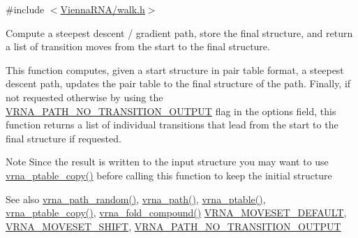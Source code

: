 {\ttfamily \#include $<$\hyperlink{walk_8h}{Vienna\+R\+N\+A/walk.\+h}$>$}



Compute a steepest descent / gradient path, store the final structure, and return a list of transition moves from the start to the final structure. 

This function computes, given a start structure in pair table format, a steepest descent path, updates the pair table to the final structure of the path. Finally, if not requested otherwise by using the \hyperlink{group__paths_ga1ee63e54ecf136491e12ff03ede2622d}{V\+R\+N\+A\+\_\+\+P\+A\+T\+H\+\_\+\+N\+O\+\_\+\+T\+R\+A\+N\+S\+I\+T\+I\+O\+N\+\_\+\+O\+U\+T\+P\+UT} flag in the {\ttfamily options} field, this function returns a list of individual transitions that lead from the start to the final structure if requested.

\begin{DoxyNote}{Note}
Since the result is written to the input structure you may want to use \hyperlink{group__struct__utils__pair__table_ga2daefbbd6d9f8803731651882f54332d}{vrna\+\_\+ptable\+\_\+copy()} before calling this function to keep the initial structure
\end{DoxyNote}
\begin{DoxySeeAlso}{See also}
\hyperlink{group__paths_ga9234756c337078fa599529d3db70d913}{vrna\+\_\+path\+\_\+random()}, \hyperlink{group__paths_gab6aee4143f8b103518d5cbfe6bfe5eae}{vrna\+\_\+path()}, \hyperlink{group__struct__utils__pair__table_gae829fb8bb7f694c12a9c0bbc34c77c60}{vrna\+\_\+ptable()}, \hyperlink{group__struct__utils__pair__table_ga2daefbbd6d9f8803731651882f54332d}{vrna\+\_\+ptable\+\_\+copy()}, \hyperlink{group__fold__compound_ga6601d994ba32b11511b36f68b08403be}{vrna\+\_\+fold\+\_\+compound()} \hyperlink{group__neighbors_gaa5ffec4dd0d02df320f123e6888154d1}{V\+R\+N\+A\+\_\+\+M\+O\+V\+E\+S\+E\+T\+\_\+\+D\+E\+F\+A\+U\+LT}, \hyperlink{group__neighbors_ga68ea27c81de4b74e48b775c04052590b}{V\+R\+N\+A\+\_\+\+M\+O\+V\+E\+S\+E\+T\+\_\+\+S\+H\+I\+FT}, \hyperlink{group__paths_ga1ee63e54ecf136491e12ff03ede2622d}{V\+R\+N\+A\+\_\+\+P\+A\+T\+H\+\_\+\+N\+O\+\_\+\+T\+R\+A\+N\+S\+I\+T\+I\+O\+N\+\_\+\+O\+U\+T\+P\+UT}
\end{DoxySeeAlso}


